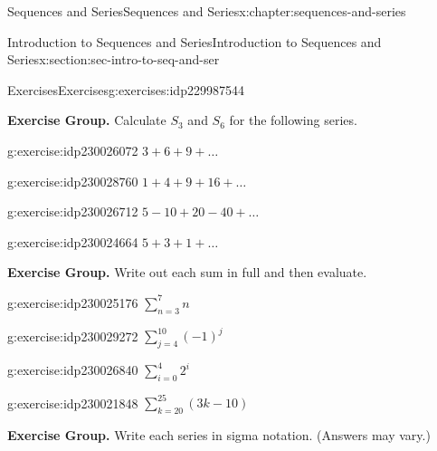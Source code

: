 \documentclass[twoside,10pt,]{book}
\numberwithin{equation}{section}
\begin{document}
\begin{chapterptx}{Sequences and Series}{}{Sequences and Series}{}{}{x:chapter:sequences-and-series}
\begin{sectionptx}{Introduction to Sequences and Series}{}{Introduction to Sequences and Series}{}{}{x:section:sec-intro-to-seq-and-ser}
\begin{exercises-subsection}{Exercises}{}{Exercises}{}{}{g:exercises:idp229987544}
\begin{exercisegroup}
\end{exercisegroup}
\par\medskip\noindent
\par\medskip\noindent%
\textbf{Exercise Group.}\space\space%
Calculate \(S_3\) and \(S_6\) for the following series.\begin{exercisegroup}
\begin{divisionexerciseeg}{25}{}{}{g:exercise:idp230026072}%
\(3 + 6 + 9 + \ldots\)\end{divisionexerciseeg}%
\begin{divisionexerciseeg}{26}{}{}{g:exercise:idp230028760}%
\(1 + 4 + 9 + 16 + \ldots\)\end{divisionexerciseeg}%
\begin{divisionexerciseeg}{27}{}{}{g:exercise:idp230026712}%
\(5 -10 + 20 - 40 + \ldots\)\end{divisionexerciseeg}%
\begin{divisionexerciseeg}{28}{}{}{g:exercise:idp230024664}%
\(5 + 3 + 1 + \ldots\)\end{divisionexerciseeg}%
\end{exercisegroup}
\par\medskip\noindent
\par\medskip\noindent%
\textbf{Exercise Group.}\space\space%
Write out each sum in full and then evaluate.\begin{exercisegroup}
\begin{divisionexerciseeg}{29}{}{}{g:exercise:idp230025176}%
\(\sum\limits_{n = 3}^7 n \)\end{divisionexerciseeg}%
\begin{divisionexerciseeg}{30}{}{}{g:exercise:idp230029272}%
\(\sum\limits_{j = 4}^{10} {{{\left( { - 1} \right)}^j}}\)\end{divisionexerciseeg}%
\begin{divisionexerciseeg}{31}{}{}{g:exercise:idp230026840}%
\(\sum\limits_{i = 0}^4 {{2^i}}\)\end{divisionexerciseeg}%
\begin{divisionexerciseeg}{32}{}{}{g:exercise:idp230021848}%
\(\sum\limits_{k = 20}^{25} {\left( {3k - 10} \right)}\)\end{divisionexerciseeg}%
\end{exercisegroup}
\par\medskip\noindent
\par\medskip\noindent%
\textbf{Exercise Group.}\space\space%
Write each series in sigma notation.  (Answers may vary.)\begin{exercisegroup}

\end{exercisegroup}
\end{exercises-subsection}
\end{sectionptx}
\end{chapterptx}
\end{document}
